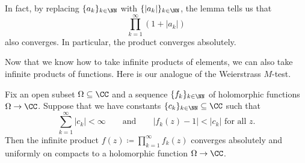 \documentclass[notes.tex]{subfiles}
\begin{document}
\begin{remark} \label{rem:inf-prod-abs-conv}
	In fact, by replacing $\{a_k\}_{k\in\NN}$ with $\{|a_k|\}_{k\in\NN}$, the lemma tells us that
	\[\prod_{k=1}^\infty(1+|a_k|)\]
	also converges. In particular, the product converges absolutely.
\end{remark}
Now that we know how to take infinite products of elements, we can also take infinite products of functions. Here is our analogue of the Weierstrass $M$-test.
\begin{proposition} \label{prop:inf-prod-holos}
	Fix an open subset $\Omega\subseteq\CC$ and a sequence $\{f_k\}_{k\in\NN}$ of holomorphic functions $\Omega\to\CC$. Suppose that we have constants $\{c_k\}_{k\in\NN}\subseteq\CC$ such that
	\[\sum_{k=1}^\infty|c_k|<\infty\qquad\text{and}\qquad|f_k(z)-1|<|c_k|\text{ for all }z.\]
	Then the infinite product $f(z)\coloneqq\prod_{k=1}^\infty f_k(z)$ converges absolutely and uniformly on compacts to a holomorphic function $\Omega\to\CC$.
\end{proposition}
\end{document}
